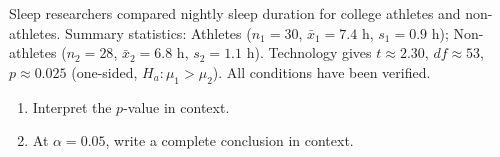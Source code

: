 \documentclass[10pt]{article}
\begin{document}
\namedateperiod

\vspace{0.15in}

Sleep researchers compared nightly sleep duration for college athletes and non-athletes.
Summary statistics: Athletes ($n_1 = 30$, $\bar x_1 = 7.4$ h, $s_1 = 0.9$ h);
Non-athletes ($n_2 = 28$, $\bar x_2 = 6.8$ h, $s_2 = 1.1$ h).
Technology gives $t \approx 2.30$, $df \approx 53$, $p \approx 0.025$ (one-sided, $H_a: \mu_1 > \mu_2$).
All conditions have been verified.

\begin{enumerate}
  \item Interpret the $p$-value in context.

  \item At $\alpha = 0.05$, write a complete conclusion in context.
\end{enumerate}
\end{document}
